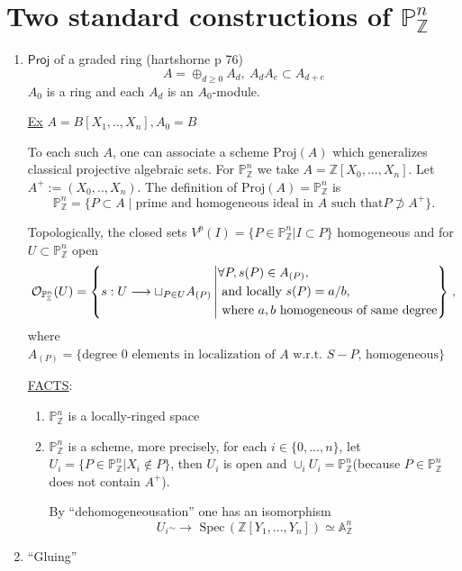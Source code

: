 \documentclass[11pt]{article}
\theoremstyle{definition}
\newcommand{\spec}{\text{ Spec}\,}
\newcommand{\affn}{\mathbb A}
\newcommand{\proj}{\mathbb P}
\newcommand{\intg}{\mathbb Z}
\newcommand{\calo}{{\cal O}}
\newcommand{\notsupset}{\not \supset}
\newcommand{\lrta}{\longrightarrow}
\begin{document}
\section*{Two standard constructions of $\proj^n_\intg$}
\begin{enumerate}[label=(\arabic*)]
\item $\mathsf{Proj}$ of a graded ring (hartshorne p 76)
$$
A=\oplus_{d\geq 0} A_d, ~A_d A_e\subset A_{d+e}
$$
$A_0$ is a ring and each $A_d$ is an $A_0$-module.

\underline{Ex} $A=B[X_1,..,X_n],A_0=B$

To each such $A$, one can associate a scheme $\text{Proj}(A)$ which generalizes classical projective algebraic sets. For $\proj^n_\intg$ we take $A=\intg[X_0,...,X_n]$. Let $A^+:=(X_0,..,X_n)$. The definition of $\text{Proj}(A)=\proj^n_\intg$ is 
$$
\proj^n_\intg=\{P\subset A\mid \text{prime and homogeneous ideal in $A$ such that} P\notsupset A^+\}.
$$

Topologically, the closed sets $V^p(I)=\{P\in\proj^n_\intg|I \subset P\}$ homogeneous and for $U\subset \proj^n_\intg$ open
$$
\calo_{\proj_\intg^n}(U)=\left\{
s:U\lrta \sqcup_{P\in U}A_{(P)}\left| \begin{aligned} &\forall P, s(P)\in A_{(P)},\\
&\text{ and  locally } s(P)=a/b,\\
& \text{ where } a,b \text{ homogeneous  of same degree}
\end{aligned}
\right\}
\right.,
$$
where $A_{(P)}=\{\text{degree $0$ elements in localization of $A$ w.r.t. $S-P$, homogeneous}\}$

\underline{FACTS}:
\begin{enumerate}
\item $\proj^n_\intg$ is  a locally-ringed space
\item $\proj^n_\intg$ is a scheme, more precisely, for each $i\in \{0,...,n\}$, let $U_i=\{P\in \proj^n_\intg|X_i\notin P\}$, then $U_i$ is open and $\cup_i U_i =\proj^n_\intg$(because $P\in \proj^n_\intg$ does not contain $A^+$).

By ``dehomogeneousation'' one has an isomorphism
$$
U_i\overset{\sim}{}\lrta 
\spec(\intg[Y_1,...,Y_n])\simeq \affn^n_\intg$$
\end{enumerate}
\item ``Gluing''

        

\begin{tikzpicture}[x=0.75pt,y=0.75pt,yscale=-1,xscale=1]


\end{tikzpicture}
\end{enumerate}
\end{document}

